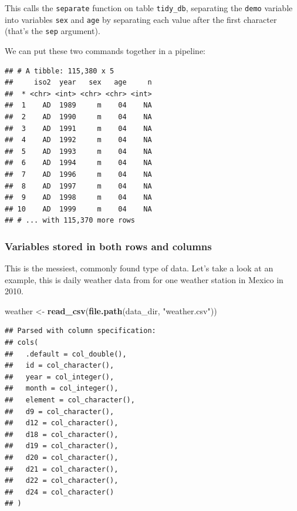 \documentclass[]{article}
\newenvironment{Shaded}{\begin{snugshade}}{\end{snugshade}}
\newcommand{\KeywordTok}[1]{\textcolor[rgb]{0.13,0.29,0.53}{\textbf{{#1}}}}
\newcommand{\DataTypeTok}[1]{\textcolor[rgb]{0.13,0.29,0.53}{{#1}}}
\newcommand{\DecValTok}[1]{\textcolor[rgb]{0.00,0.00,0.81}{{#1}}}
\newcommand{\StringTok}[1]{\textcolor[rgb]{0.31,0.60,0.02}{{#1}}}
\newcommand{\NormalTok}[1]{{#1}}
\theoremstyle{definition}
\theoremstyle{definition}
\theoremstyle{remark}
\begin{document}
This calls the \texttt{separate} function on table \texttt{tidy\_db},
separating the \texttt{demo} variable into variables \texttt{sex} and
\texttt{age} by separating each value after the first character (that's
the \texttt{sep} argument).

We can put these two commands together in a pipeline:

\begin{Shaded}
\end{Shaded}

\begin{verbatim}
## # A tibble: 115,380 x 5
##     iso2  year   sex   age     n
##  * <chr> <int> <chr> <chr> <int>
##  1    AD  1989     m    04    NA
##  2    AD  1990     m    04    NA
##  3    AD  1991     m    04    NA
##  4    AD  1992     m    04    NA
##  5    AD  1993     m    04    NA
##  6    AD  1994     m    04    NA
##  7    AD  1996     m    04    NA
##  8    AD  1997     m    04    NA
##  9    AD  1998     m    04    NA
## 10    AD  1999     m    04    NA
## # ... with 115,370 more rows
\end{verbatim}

\subsubsection{Variables stored in both rows and
columns}\label{variables-stored-in-both-rows-and-columns}

This is the messiest, commonly found type of data. Let's take a look at
an example, this is daily weather data from for one weather station in
Mexico in 2010.

\begin{Shaded}
\begin{Highlighting}[]
\NormalTok{weather <-}\StringTok{ }\KeywordTok{read_csv}\NormalTok{(}\KeywordTok{file.path}\NormalTok{(data_dir, }\StringTok{"weather.csv"}\NormalTok{))}
\end{Highlighting}
\end{Shaded}

\begin{verbatim}
## Parsed with column specification:
## cols(
##   .default = col_double(),
##   id = col_character(),
##   year = col_integer(),
##   month = col_integer(),
##   element = col_character(),
##   d9 = col_character(),
##   d12 = col_character(),
##   d18 = col_character(),
##   d19 = col_character(),
##   d20 = col_character(),
##   d21 = col_character(),
##   d22 = col_character(),
##   d24 = col_character()
## )
\end{verbatim}
\end{document}
